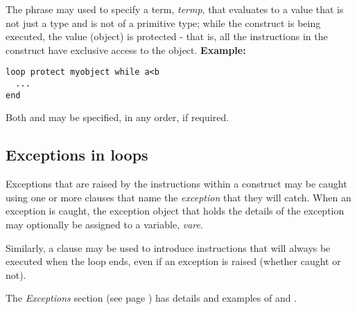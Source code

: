 The  phrase may used to specify a term,
\emph{termp}, that evaluates to a value that is not just a type and
is not of a primitive type;
while the  construct is being executed, the value (object)
is protected - that is, all the instructions in the 
construct have exclusive access to the object.
 \textbf{Example:}
\begin{lstlisting}
loop protect myobject while a<b
  ...
end
\end{lstlisting}
 
Both  and  may be specified, in any order,
if required.
\subsection{Exceptions in loops}
 
Exceptions that are raised by the instructions within a 
construct may be caught using one or more  clauses that
name the \emph{exception} that they will catch.  When an exception is
caught, the exception object that holds the details of the exception may
optionally be assigned to a variable, \emph{vare}.
 
Similarly, a  clause may be used to introduce
instructions that will always be executed when the loop ends, even if an
exception is raised (whether caught or not).
 
The  \emph{Exceptions} section (see page \pageref{refexcep})  has details and
examples of  and .
